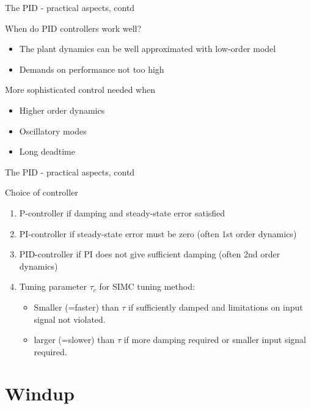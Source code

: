 \documentclass[presentation,aspectratio=169, usenames, dvipsnames]{beamer}
\begin{document}
\begin{frame}[label={sec:org1c251d6}]{The PID - practical aspects, contd}
\begin{block}{When do PID controllers work well?}
\begin{itemize}
\item The plant dynamics can be well approximated with low-order model
\item Demands on performance not too high
\end{itemize}
\end{block}
\begin{block}{More sophisticated control needed when}
\begin{itemize}
\item Higher order dynamics
\item Oscillatory modes
\item Long deadtime
\end{itemize}
\end{block}
\end{frame}

\begin{frame}[label={sec:org08e8600}]{The PID - practical aspects, contd}
\begin{block}{Choice of controller}
\begin{enumerate}
\item P-controller if damping and steady-state error satisfied
\item PI-controller if steady-state error must be zero (often 1st order dynamics)
\item PID-controller if PI does not give sufficient damping (often 2nd order dynamics)
\item Tuning parameter \(\tau_c\) for SIMC tuning method: 
\begin{itemize}
\item Smaller (=faster) than \(\tau\) if sufficiently damped and limitations on input signal not violated.
\item larger (=slower) than \(\tau\) if more damping required or smaller input signal required.
\end{itemize}
\end{enumerate}
\end{block}
\end{frame}



\section{Windup}
\label{sec:orgf647507}
\end{document}
